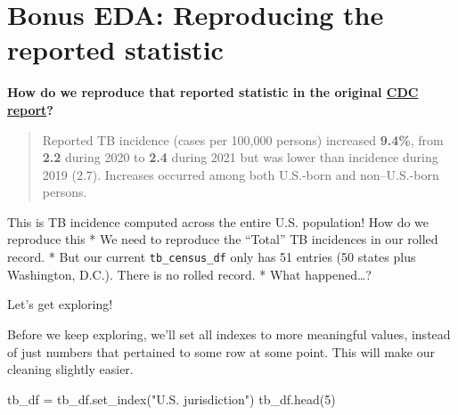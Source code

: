 \documentclass[
  letterpaper,
  DIV=11,
  numbers=noendperiod]{scrreprt}
\newenvironment{Shaded}{\begin{snugshade}}{\end{snugshade}}
\newcommand{\DecValTok}[1]{\textcolor[rgb]{0.68,0.00,0.00}{#1}}
\newcommand{\NormalTok}[1]{\textcolor[rgb]{0.00,0.23,0.31}{#1}}
\newcommand{\OperatorTok}[1]{\textcolor[rgb]{0.37,0.37,0.37}{#1}}
\newcommand{\StringTok}[1]{\textcolor[rgb]{0.13,0.47,0.30}{#1}}
\begin{document}
\hypertarget{bonus-eda-reproducing-the-reported-statistic}{%
\section{Bonus EDA: Reproducing the reported
statistic}\label{bonus-eda-reproducing-the-reported-statistic}}

\textbf{How do we reproduce that reported statistic in the original
\href{https://www.cdc.gov/mmwr/volumes/71/wr/mm7112a1.htm?s_cid=mm7112a1_w}{CDC
report}?}

\begin{quote}
Reported TB incidence (cases per 100,000 persons) increased
\textbf{9.4\%}, from \textbf{2.2} during 2020 to \textbf{2.4} during
2021 but was lower than incidence during 2019 (2.7). Increases occurred
among both U.S.-born and non--U.S.-born persons.
\end{quote}

This is TB incidence computed across the entire U.S. population! How do
we reproduce this * We need to reproduce the ``Total'' TB incidences in
our rolled record. * But our current \texttt{tb\_census\_df} only has 51
entries (50 states plus Washington, D.C.). There is no rolled record. *
What happened\ldots?

Let's get exploring!

Before we keep exploring, we'll set all indexes to more meaningful
values, instead of just numbers that pertained to some row at some
point. This will make our cleaning slightly easier.

\begin{Shaded}
\begin{Highlighting}[]
\NormalTok{tb\_df }\OperatorTok{=}\NormalTok{ tb\_df.set\_index(}\StringTok{"U.S. jurisdiction"}\NormalTok{)}
\NormalTok{tb\_df.head(}\DecValTok{5}\NormalTok{)}
\end{Highlighting}
\end{Shaded}
\end{document}
